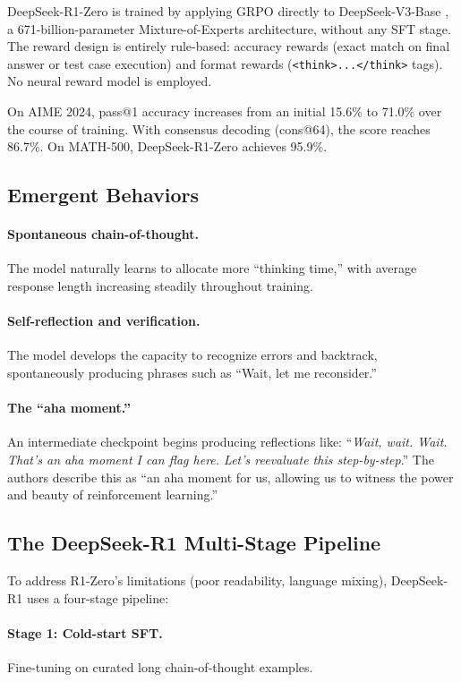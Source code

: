 \documentclass[12pt,a4paper]{report}
\begin{document}
DeepSeek-R1-Zero is trained by applying GRPO directly to DeepSeek-V3-Base \cite{deepseek2024v3}, a 671-billion-parameter Mixture-of-Experts architecture, without any SFT stage. The reward design is entirely rule-based: accuracy rewards (exact match on final answer or test case execution) and format rewards (\texttt{<think>...</think>} tags). No neural reward model is employed.

On AIME 2024, pass@1 accuracy increases from an initial 15.6\% to 71.0\% over the course of training. With consensus decoding (cons@64), the score reaches 86.7\%. On MATH-500, DeepSeek-R1-Zero achieves 95.9\%.

\subsection{Emergent Behaviors}

\paragraph{Spontaneous chain-of-thought.} The model naturally learns to allocate more ``thinking time,'' with average response length increasing steadily throughout training.

\paragraph{Self-reflection and verification.} The model develops the capacity to recognize errors and backtrack, spontaneously producing phrases such as ``Wait, let me reconsider.''

\paragraph{The ``aha moment.''} An intermediate checkpoint begins producing reflections like: ``\textit{Wait, wait. Wait. That's an aha moment I can flag here. Let's reevaluate this step-by-step}.'' The authors describe this as ``an aha moment for us, allowing us to witness the power and beauty of reinforcement learning.''

\subsection{The DeepSeek-R1 Multi-Stage Pipeline}

To address R1-Zero's limitations (poor readability, language mixing), DeepSeek-R1 uses a four-stage pipeline:

\paragraph{Stage 1: Cold-start SFT.} Fine-tuning on curated long chain-of-thought examples.
\end{document}
